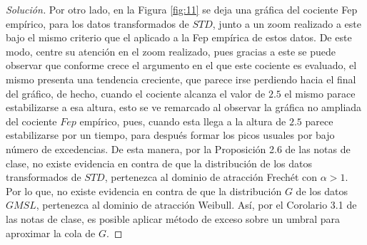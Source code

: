 \documentclass[10.5pt,notitlepage]{article}
\newenvironment{solucion}
  {\begin{proof}[Solución]}
  {\end{proof}}
\theoremstyle{plain}
\begin{document}
\begin{solucion}
Por otro lado, en la Figura \ref{fig:11} se deja una gráfica del cociente Fep empírico, para los datos transformados de \(STD\), junto a un zoom realizado a este bajo el mismo criterio que el aplicado a la Fep empírica de estos datos. De este modo, centre su atención en el zoom realizado, pues gracias a este se puede observar que conforme crece el argumento en el que este cociente es evaluado, el mismo presenta una tendencia creciente, que parece irse perdiendo hacia el final del gráfico, de hecho, cuando el cociente alcanza el valor de \(2.5\) el mismo parace estabilizarse a esa altura, esto se ve remarcado al observar la gráfica no ampliada del cociente \(Fep\) empírico, pues, cuando esta llega a la altura de \(2.5\) parece estabilizarse por un tiempo, para después formar los picos usuales por bajo número de excedencias. De esta manera, por la Proposición 2.6 de las notas de clase, no existe evidencia en contra de que la distribución de los datos transformados de \(STD\), pertenezca al dominio de atracción Frechét con \(\alpha >1\). Por lo que, no existe evidencia en contra de que la distribución \(G\) de los datos \(GMSL\), pertenezca al dominio de atracción Weibull. Así, por el Corolario 3.1 de las notas de clase, es posible aplicar método de exceso sobre un umbral para aproximar la cola de \(G\).


\end{solucion}
\end{document}
